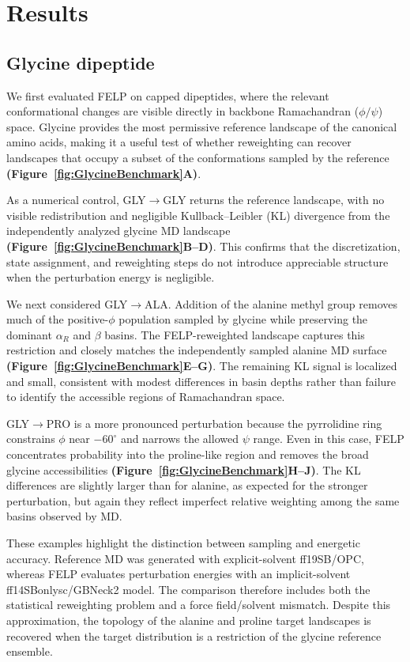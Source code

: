 \documentclass[journal=jctcce,manuscript=article,layout=twocolumn,hyperref=true]{achemso}
\newcommand{\figrefp}[2][]{\textbf{(Figure~\ref{#2}#1)}}
\begin{document}
	\section{Results}

	\subsection{Glycine dipeptide}

	We first evaluated FELP on capped dipeptides, where the relevant conformational changes are visible directly in backbone Ramachandran ($\phi/\psi$) space. Glycine provides the most permissive reference landscape of the canonical amino acids, making it a useful test of whether reweighting can recover landscapes that occupy a subset of the conformations sampled by the reference \figrefp[A]{fig:GlycineBenchmark}.

	As a numerical control, GLY$\rightarrow$GLY returns the reference landscape, with no visible redistribution and negligible Kullback--Leibler (KL) divergence from the independently analyzed glycine MD landscape \figrefp[B--D]{fig:GlycineBenchmark}. This confirms that the discretization, state assignment, and reweighting steps do not introduce appreciable structure when the perturbation energy is negligible.

	We next considered GLY$\rightarrow$ALA. Addition of the alanine methyl group removes much of the positive-$\phi$ population sampled by glycine while preserving the dominant $\alpha_R$ and $\beta$ basins. The FELP-reweighted landscape captures this restriction and closely matches the independently sampled alanine MD surface \figrefp[E--G]{fig:GlycineBenchmark}. The remaining KL signal is localized and small, consistent with modest differences in basin depths rather than failure to identify the accessible regions of Ramachandran space.

	GLY$\rightarrow$PRO is a more pronounced perturbation because the pyrrolidine ring constrains $\phi$ near $-60^\circ$ and narrows the allowed $\psi$ range. Even in this case, FELP concentrates probability into the proline-like region and removes the broad glycine accessibilities \figrefp[H--J]{fig:GlycineBenchmark}. The KL differences are slightly larger than for alanine, as expected for the stronger perturbation, but again they reflect imperfect relative weighting among the same basins observed by MD.

	These examples highlight the distinction between sampling and energetic accuracy. Reference MD was generated with explicit-solvent ff19SB/OPC, whereas FELP evaluates perturbation energies with an implicit-solvent ff14SBonlysc/GBNeck2 model. The comparison therefore includes both the statistical reweighting problem and a force field/solvent mismatch. Despite this approximation, the topology of the alanine and proline target landscapes is recovered when the target distribution is a restriction of the glycine reference ensemble.
\end{document}
